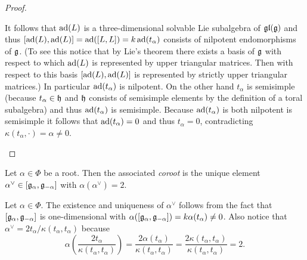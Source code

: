 \begin{proof}
\begin{enumerate}[leftmargin=*]
   It follows that $\operatorname{ad}(L)$ is a three-dimensional solvable Lie subalgebra of $\mathfrak{gl}(\mathfrak{g})$ and thus $[\operatorname{ad}(L), \operatorname{ad}(L)] = \operatorname{ad}([L,L]) = k \operatorname{ad}(t_\alpha)$ consists of nilpotent endomorphisms of $\mathfrak{g}$. (To see this notice that by Lie’s theorem there exists a basis of $\mathfrak{g}$ with respect to which $\operatorname{ad}(L)$ is represented by upper triangular matrices. Then with respect to this basis $[\operatorname{ad}(L), \operatorname{ad}(L)]$ is represented by strictly upper triangular matrices.) In particular $\operatorname{ad}(t_\alpha)$ is nilpotent. On the other hand $t_\alpha$ is semisimple (because $t_\alpha \in \mathfrak{h}$ and $\mathfrak{h}$ consists of semisimple elements by the definition of a toral subalgebra) and thus $\operatorname{ad}(t_\alpha)$ is semisimple. Because $\operatorname{ad}(t_\alpha)$ is both nilpotent is semisimple it follows that $\operatorname{ad}(t_\alpha) = 0$ and thus $t_\alpha = 0$, contradicting $\kappa(t_\alpha, \cdot) = \alpha \neq 0$.
  \qedhere
 \end{enumerate}
\end{proof}


\begin{defi}
 Let $\alpha \in \Phi$ be a root. Then the associated \emph{coroot} is the unique element $\alpha^\vee \in [\mathfrak{g}_\alpha, \mathfrak{g}_{-\alpha}]$ with $\alpha(\alpha^\vee) = 2$.
\end{defi}


\begin{rem}
 Let $\alpha \in \Phi$. The existence and uniqueness of $\alpha^\vee$ follows from the fact that $[\mathfrak{g}_\alpha, \mathfrak{g}_{-\alpha}]$ is one-dimensional with $\alpha([\mathfrak{g}_\alpha, \mathfrak{g}_{-\alpha}]) = k \alpha(t_\alpha) \neq 0$. Also notice that $\alpha^\vee = 2 t_\alpha / \kappa(t_\alpha, t_\alpha)$ because
 \[
  \alpha\left( \frac{2 t_\alpha}{\kappa(t_\alpha, t_\alpha)} \right)
  = \frac{2\alpha(t_\alpha)}{\kappa(t_\alpha, t_\alpha)}
  = \frac{2\kappa(t_\alpha,t_\alpha)}{\kappa(t_\alpha, t_\alpha)}
  = 2.
 \] 
\end{rem}























